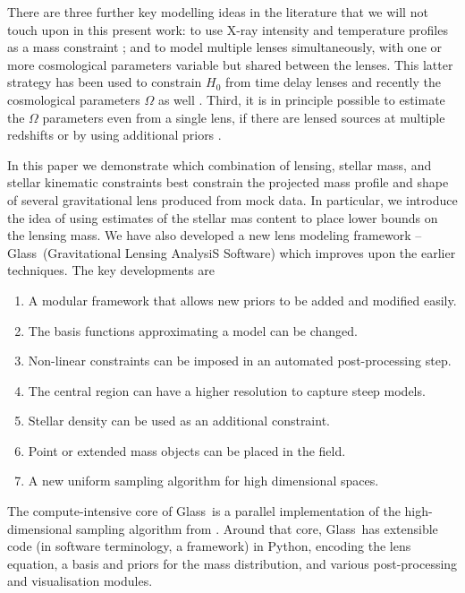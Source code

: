 \documentclass[galley,usenatbib]{mn2e}
\newcommand{\Glass}{{\sc Glass}}
\begin{document}
There are three further key modelling ideas in the literature that we will not
touch upon in this present work: to use X-ray intensity and temperature
profiles as a mass constraint \citep[e.g.][]{2013ApJ...765...25N}; and to model
multiple lenses simultaneously, with one or more cosmological parameters
variable but shared between the lenses. This latter strategy has been used to
constrain $H_0$ from time delay lenses
\citep{2006ApJ...652L...5S,2008ApJ...679...17C,2010ApJ...712.1378P} and
recently the cosmological parameters $\Omega$ as well
\citep{2014MNRAS.437..600S}.  Third, it is in principle possible to estimate
the $\Omega$ parameters even from a single lens, if there are lensed sources at
multiple redshifts \citep{2014MNRAS.437.2461L} or by using additional priors 
\citep{2010Sci...329..924J,2013arXiv1306.4732S}.

In this paper we demonstrate which combination of lensing, stellar mass, and
stellar kinematic constraints best constrain the projected mass profile and
shape of several gravitational lens produced from mock data. In particular,
we introduce the idea of using estimates of the stellar mas content to place
lower bounds on the lensing mass.
We have also developed a new lens modeling framework  -- \Glass\ (Gravitational
Lensing AnalysiS Software) which improves upon the earlier techniques. The
key developments are

\begin{enumerate}
\item A modular framework that allows new priors to be added and modified easily.
\item The basis functions approximating a model can be changed.
\item Non-linear constraints can be imposed in an automated post-processing step.
\item The central region can have a higher resolution to capture steep models.
\item Stellar density can be used as an additional constraint.
\item Point or extended mass objects can be placed in the field.
\item A new uniform sampling algorithm for high dimensional spaces.
\end{enumerate}

The compute-intensive core of \Glass\ is a parallel
implementation of the high-dimensional sampling algorithm from
\cite{2012MNRAS.425.3077L}.  Around that core, \Glass\ has extensible code (in
software terminology, a framework) in Python, encoding the lens equation, a
basis and priors for the mass distribution, and various post-processing and
visualisation modules.  
\end{document}
